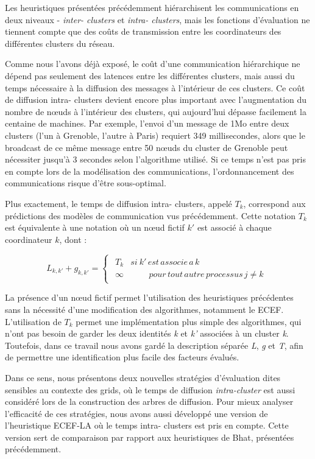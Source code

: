 Les heuristiques présentées précédemment hiérarchisent les communications en deux niveaux - \emph{inter- clusters}
et \emph{intra- clusters}, mais les fonctions d'évaluation ne tiennent compte que des coûts de transmission entre les coordinateurs
des différentes  clusters du réseau.

Comme nous l'avons déjà exposé, le coût d'une communication
hiérarchique ne dépend pas seulement des latences entre les différentes
 clusters, mais aussi du temps nécessaire à la diffusion des messages
à l'intérieur de ces  clusters. Ce coût de diffusion intra- clusters devient
encore plus important avec l'augmentation du nombre de n{\oe}uds à l'intérieur
des  clusters, qui aujourd'hui dépasse facilement la centaine de machines.
Par exemple, l'envoi d'un message de 1Mo entre deux clusters (l'un à Grenoble, l'autre à Paris) requiert 349 millisecondes, alors que
le broadcast de ce même message entre 50 n{\oe}uds du cluster de Grenoble
peut nécessiter jusqu'à 3 secondes selon l'algorithme
utilisé. Si ce temps n'est pas pris en compte lors de la modélisation
des communications, l'ordonnancement des communications risque d'être
sous-optimal.

Plus exactement, le temps de diffusion intra- clusters, appelé $T_{k}$,
correspond aux prédictions des modèles de communication vus précédemment. 
Cette notation $T_{k}$ est équivalente à une notation où un n{\oe}ud
fictif $k'$ est associé à chaque coordinateur $k$, dont :

\[
L_{k,k'}+g_{k,k'}=\left\{ \begin{array}{c}
\begin{array}{cc}
T_{k} & si\: k'\, est\, associe\, a\, k\\
\infty & \,\,\,\,\,\,\,\,\,\,\,\,\, pour\, tout\, autre\, processus\, j\neq k\end{array}\end{array}\right.\]


La présence d'un n{\oe}ud fictif permet l'utilisation des heuristiques
précédentes sans la nécessité d'une modification des algorithmes,
notamment le ECEF. L'utilisation de $T_{k}$ permet une implémentation
plus simple des algorithmes, qui n'ont pas besoin de garder les deux
identités \emph{k} et \emph{k'} associées à un  cluster \emph{k}. Toutefois, dans ce travail nous avons gardé
la description séparée \emph{L}, \emph{g} et \emph{T}, afin
de permettre une identification plus facile des facteurs évalués.

Dans ce sens, nous présentons deux nouvelles stratégies d'évaluation
dites \og sensibles au contexte des grids\fg{}, où
le temps de diffusion \emph{intra-cluster} est aussi considéré lors
de la construction des arbres de diffusion. Pour mieux analyser l'efficacité
de ces stratégies, nous avons aussi développé une version de l'heuristique
ECEF-LA où le temps intra- clusters est pris en compte. Cette version
sert de comparaison par rapport aux heuristiques de Bhat, présentées
précédemment. 


